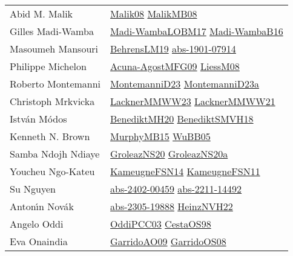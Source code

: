 {\begin{longtable}{p{4cm}p{20cm}}
Abid M. Malik & \href{}{Malik08}\cite{Malik08} \href{}{MalikMB08}\cite{MalikMB08} \\
Gilles Madi{-}Wamba & \href{papers/Madi-WambaLOBM17.pdf}{Madi-WambaLOBM17}\cite{Madi-WambaLOBM17} \href{papers/Madi-WambaB16.pdf}{Madi-WambaB16}\cite{Madi-WambaB16} \\
Masoumeh Mansouri & \href{papers/BehrensLM19.pdf}{BehrensLM19}\cite{BehrensLM19} \href{articles/abs-1901-07914.pdf}{abs-1901-07914}\cite{abs-1901-07914} \\
Philippe Michelon & \href{papers/Acuna-AgostMFG09.pdf}{Acuna-AgostMFG09}\cite{Acuna-AgostMFG09} \href{articles/LiessM08.pdf}{LiessM08}\cite{LiessM08} \\
Roberto Montemanni & \href{articles/MontemanniD23.pdf}{MontemanniD23}\cite{MontemanniD23} \href{articles/MontemanniD23a.pdf}{MontemanniD23a}\cite{MontemanniD23a} \\
Christoph Mrkvicka & \href{articles/LacknerMMWW23.pdf}{LacknerMMWW23}\cite{LacknerMMWW23} \href{papers/LacknerMMWW21.pdf}{LacknerMMWW21}\cite{LacknerMMWW21} \\
Istv{\'{a}}n M{\'{o}}dos & \href{articles/BenediktMH20.pdf}{BenediktMH20}\cite{BenediktMH20} \href{papers/BenediktSMVH18.pdf}{BenediktSMVH18}\cite{BenediktSMVH18} \\
Kenneth N. Brown & \href{papers/MurphyMB15.pdf}{MurphyMB15}\cite{MurphyMB15} \href{papers/WuBB05.pdf}{WuBB05}\cite{WuBB05} \\
Samba Ndojh Ndiaye & \href{papers/GroleazNS20.pdf}{GroleazNS20}\cite{GroleazNS20} \href{}{GroleazNS20a}\cite{GroleazNS20a} \\
Youcheu Ngo{-}Kateu & \href{articles/KameugneFSN14.pdf}{KameugneFSN14}\cite{KameugneFSN14} \href{papers/KameugneFSN11.pdf}{KameugneFSN11}\cite{KameugneFSN11} \\
Su Nguyen & \href{articles/abs-2402-00459.pdf}{abs-2402-00459}\cite{abs-2402-00459} \href{articles/abs-2211-14492.pdf}{abs-2211-14492}\cite{abs-2211-14492} \\
Anton{\'{\i}}n Nov{\'{a}}k & \href{articles/abs-2305-19888.pdf}{abs-2305-19888}\cite{abs-2305-19888} \href{articles/HeinzNVH22.pdf}{HeinzNVH22}\cite{HeinzNVH22} \\
Angelo Oddi & \href{papers/OddiPCC03.pdf}{OddiPCC03}\cite{OddiPCC03} \href{papers/CestaOS98.pdf}{CestaOS98}\cite{CestaOS98} \\
Eva Onaindia & \href{articles/GarridoAO09.pdf}{GarridoAO09}\cite{GarridoAO09} \href{articles/GarridoOS08.pdf}{GarridoOS08}\cite{GarridoOS08} \\

\end{longtable}}
